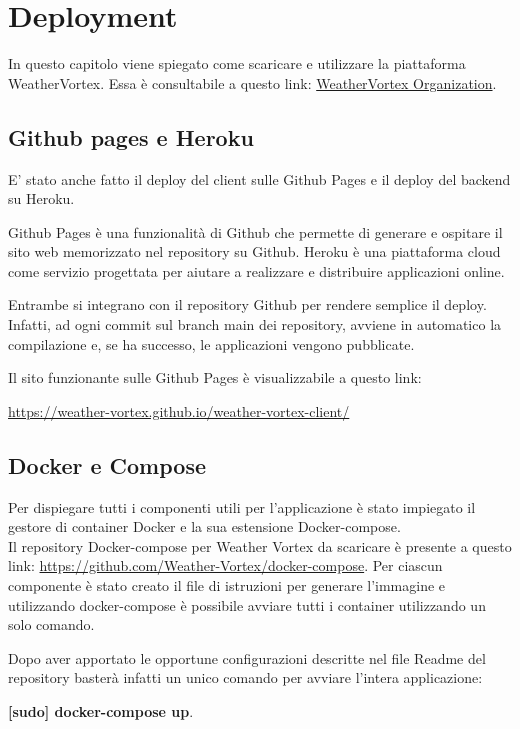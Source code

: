 

\chapter{Deployment}

In questo capitolo viene spiegato come scaricare e utilizzare la piattaforma
WeatherVortex. Essa è consultabile a questo link: \href{https://github.com/Weather-Vortex}{WeatherVortex Organization}.

\section{Github pages e Heroku}
E' stato anche fatto il deploy del client sulle Github Pages e il deploy del backend su Heroku.

Github Pages è una funzionalità di Github che permette di generare e ospitare il sito web memorizzato nel repository su Github. Heroku è una piattaforma cloud come servizio progettata per aiutare a realizzare e distribuire applicazioni online.

Entrambe si integrano con il repository Github per rendere semplice il deploy. Infatti, ad ogni commit sul branch main dei repository, avviene in automatico la compilazione e, se ha successo, le applicazioni vengono pubblicate. 

Il sito funzionante sulle Github Pages è visualizzabile a questo link:

\href{https://weather-vortex.github.io/weather-vortex-client/}{https://weather-vortex.github.io/weather-vortex-client/}


\section{Docker e Compose}
Per dispiegare tutti i componenti utili per l’applicazione è stato impiegato il
gestore di container Docker e la sua estensione Docker-compose.\\
Il repository Docker-compose per Weather Vortex da scaricare è presente a questo link:
\href{https://github.com/Weather-Vortex/docker-compose}{https://github.com/Weather-Vortex/docker-compose}.
Per ciascun componente è stato creato il file di istruzioni per generare l’immagine e utilizzando docker-compose è possibile avviare tutti i container utilizzando un solo comando.

Dopo aver apportato le opportune configurazioni descritte nel file Readme del repository basterà infatti un unico comando per avviare l'intera applicazione:

\textbf{[sudo] docker-compose up}.
